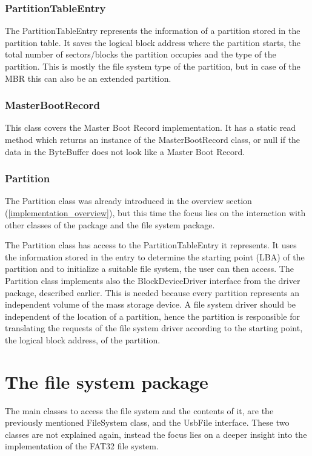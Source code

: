 \subsubsection{PartitionTableEntry}

The PartitionTableEntry represents the information of a partition stored in the partition table. It saves the logical block address where the partition starts, the total number of sectors/blocks the partition occupies and the type of the partition. This is mostly the file system type of the partition, but in case of the MBR this can also be an extended partition.

\subsubsection{MasterBootRecord}

This class covers the Master Boot Record implementation. It has a static read method which returns an instance of the MasterBootRecord class, or null if the data in the ByteBuffer does not look like a Master Boot Record.

\subsubsection{Partition}

The Partition class was already introduced in the overview section (\ref{implementation_overview}), but this time the focus lies on the interaction with other classes of the package and the file system package. 

The Partition class has access to the PartitionTableEntry it represents. It uses the information stored in the entry to determine the starting point (LBA) of the partition and to initialize a suitable file system, the user can then access. The Partition class implements also the BlockDeviceDriver interface from the driver package, described earlier. This is needed because every partition represents an independent volume of the mass storage device. A file system driver should be independent of the location of a partition, hence the partition is responsible for translating the requests of the file system driver according to the starting point, the logical block address, of the partition.

\section{The file system package}

The main classes to access the file system and the contents of it, are the previously mentioned FileSystem class, and the UsbFile interface. These two classes are not explained again, instead the focus lies on a deeper insight into the implementation of the FAT32 file system.

